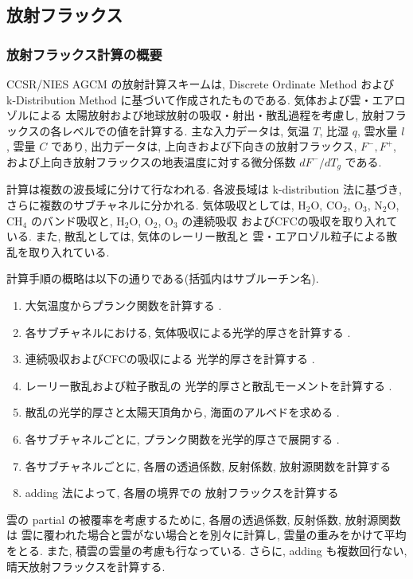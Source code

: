 ﻿\subsection{放射フラックス}

\subsubsection{放射フラックス計算の概要}

CCSR/NIES AGCM の放射計算スキームは, 
Discrete Ordinate Method および 
k-Distribution Method に基づいて作成されたものである.
気体および雲・エアロゾルによる
太陽放射および地球放射の吸収・射出・散乱過程を考慮し,
放射フラックスの各レベルでの値を計算する.
主な入力データは, 気温 $T$, 比湿 $q$, 雲水量 $l$, 雲量 $C$ であり,
出力データは, 上向きおよび下向きの放射フラックス, $F^-, F^+$,
および上向き放射フラックスの地表温度に対する微分係数
$dF^-/dT_g$ である.

計算は複数の波長域に分けて行なわれる.
各波長域は k-distribution 法に基づき,
さらに複数のサブチャネルに分かれる.
気体吸収としては, 
H$_2$O, CO$_2$, O$_3$, N$_2$O, CH$_4$ のバンド吸収と,
H$_2$O, O$_2$, O$_3$ の連続吸収
およびCFCの吸収を取り入れている.
また, 散乱としては, 気体のレーリー散乱と
雲・エアロゾル粒子による散乱を取り入れている.

計算手順の概略は以下の通りである(括弧内はサブルーチン名).
%
\begin{enumerate}
\item 大気温度からプランク関数を計算する .
\item 各サブチャネルにおける,
      気体吸収による光学的厚さを計算する .
\item 連続吸収およびCFCの吸収による
      光学的厚さを計算する .
\item レーリー散乱および粒子散乱の
      光学的厚さと散乱モーメントを計算する .
\item 散乱の光学的厚さと太陽天頂角から, 
      海面のアルベドを求める .
\item 各サブチャネルごとに,
      プランク関数を光学的厚さで展開する .
\item 各サブチャネルごとに,
      各層の透過係数, 反射係数, 放射源関数を計算する 
\item adding 法によって, 各層の境界での
      放射フラックスを計算する 
\end{enumerate}

雲の partial の被覆率を考慮するために,
各層の透過係数, 反射係数, 放射源関数は
雲に覆われた場合と雲がない場合とを別々に計算し,
雲量の重みをかけて平均をとる.
また, 積雲の雲量の考慮も行なっている.
さらに, adding も複数回行ない, 晴天放射フラックスを計算する.

